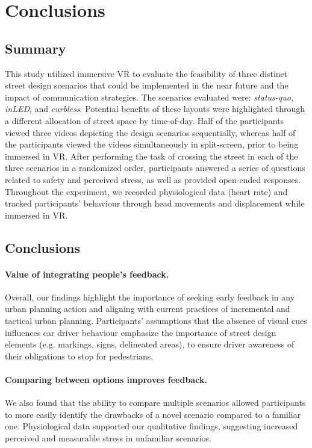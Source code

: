 \section{Conclusions}

\subsection{Summary}

This study utilized immersive VR to evaluate the feasibility of three distinct street design scenarios that could be implemented in the near future and the impact of communication strategies. The scenarios evaluated were: \emph{status-quo}, \emph{inLED}, and \emph{curbless}. Potential benefits of these layouts were highlighted through a different allocation of street space by time-of-day. Half of the participants viewed three videos depicting the design scenarios sequentially, whereas half of the participants viewed the videos simultaneously in split-screen, prior to being immersed in VR. After performing the task of crossing the street in each of the three scenarios in a randomized order, participants answered a series of questions related to safety and perceived stress, as well as provided open-ended responses. Throughout the experiment, we recorded physiological data (heart rate) and tracked participants' behaviour through head movements and displacement while immersed in VR. 

\subsection{Conclusions}

\paragraph{Value of integrating people's feedback.} 
Overall, our findings highlight the importance of seeking early feedback in any urban planning action and aligning with current practices of incremental and tactical urban planning. Participants' assumptions that the absence of visual cues influences car driver behaviour emphasize the importance of street design elements (e.g. markings, signs, delineated areas), to ensure driver awareness of their obligations to stop for pedestrians. 

\paragraph{Comparing between options improves feedback.} We also found that the ability to compare multiple scenarios allowed participants to more easily identify the drawbacks of a novel scenario compared to a familiar one. 
Physiological data supported our qualitative findings, suggesting increased perceived and measurable stress in unfamiliar scenarios. 


